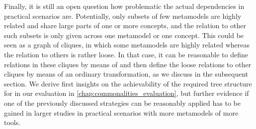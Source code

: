 Finally, it is still an open question how problematic the actual dependencies in practical scenarios are.
Potentially, only subsets of few metamodels are highly related and share large parts of one or more concepts, and the relation to other such subsets is only given across one metamodel or one concept.
This could be seen as a graph of cliques, in which some metamodels are highly related whereas the relation to others is rather loose.
In that case, it can be reasonable to define relations in these cliques by means of \commonalities and then define the loose relations to other cliques by means of an ordinary transformation, as we discuss in the subsequent section.
We derive first insights on the achievability of the required tree structure for \commonalities in our evaluation in \autoref{chap:commonalities_evaluation}, but further evidence if one of the previously discussed strategies can be reasonably applied has to be gained in larger studies in practical scenarios with more metamodels of more tools.




